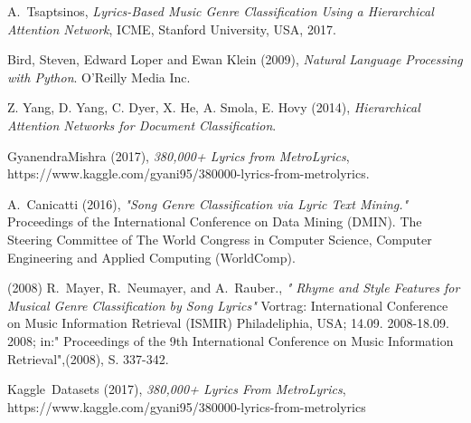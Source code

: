 \documentclass[journal]{IEEEtran}
\begin{document}
\begin{thebibliography}{6}

A.~Tsaptsinos, \emph{Lyrics-Based Music Genre Classification Using a Hierarchical Attention Network}, \relax ICME, Stanford University, USA, 2017.

Bird, Steven, Edward Loper and Ewan Klein (2009), \emph{Natural Language Processing with Python}. \relax O'Reilly Media Inc.

Z. Yang, D. Yang, C. Dyer, X. He, A. Smola, E. Hovy (2014), \emph{Hierarchical Attention Networks for Document Classification}.

GyanendraMishra (2017), \emph{380,000+ Lyrics from MetroLyrics}, https://www.kaggle.com/gyani95/380000-lyrics-from-metrolyrics.

A.~Canicatti (2016), \emph{ "Song Genre Classification via Lyric Text Mining."} \relax Proceedings of the International Conference on Data Mining (DMIN). The Steering Committee of The World Congress in Computer Science, Computer Engineering and Applied Computing (WorldComp).

 (2008) R.~Mayer, R.~Neumayer, and A.~Rauber., \emph{" Rhyme and Style Features for Musical Genre Classification by Song Lyrics"} \relax Vortrag: International Conference on Music Information Retrieval (ISMIR) Philadeliphia, USA; 14.09. 2008-18.09. 2008; in:" Proceedings of the 9th International Conference on Music Information Retrieval",(2008), S. 337-342.

 Kaggle~Datasets (2017), \emph{380,000+ Lyrics From MetroLyrics}, \relax https://www.kaggle.com/gyani95/380000-lyrics-from-metrolyrics

\end{thebibliography}

\end{document}

